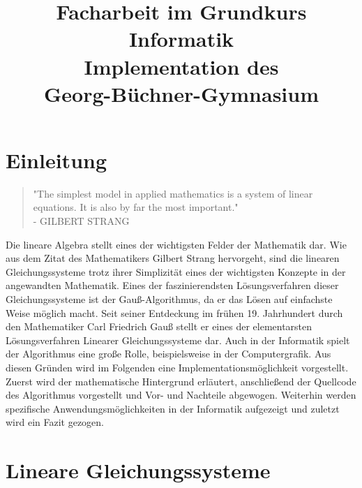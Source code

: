 \documentclass[a4paper, 12pt]{report}
\title{\LARGE Facharbeit im Grundkurs Informatik  \vspace*{0.5cm} \\
  \Huge Implementation des \GA \vspace*{0.5cm} \\
  \LARGE Georg-Büchner-Gymnasium}
\begin{document}
\maketitle
\tableofcontents

{\let\clearpage\relax \chapter{Einleitung}}
\begin{quote}
    "The simplest model in applied mathematics is a system of linear equations.
    It is also by far the most important." \\ - GILBERT STRANG
\end{quote}

Die lineare Algebra stellt eines der wichtigsten Felder der Mathematik dar. Wie aus dem Zitat des Mathematikers Gilbert Strang hervorgeht,
sind die linearen Gleichungssysteme trotz ihrer Simplizität eines der wichtigsten Konzepte in der angewandten Mathematik.
Eines der faszinierendsten Lösungsverfahren dieser Gleichungssysteme ist der Gauß-Algorithmus,
da er das Lösen auf einfachste Weise möglich macht. Seit seiner Entdeckung im frühen 19. Jahrhundert durch den
Mathematiker Carl Friedrich Gauß stellt er eines der elementarsten Lösungsverfahren Linearer Gleichungssysteme dar.
Auch in der Informatik spielt der Algorithmus eine große Rolle, beispielsweise in der Computergrafik. Aus diesen Gründen wird im Folgenden eine Implementationsmöglichkeit
vorgestellt. Zuerst wird der mathematische Hintergrund erläutert, anschließend der Quellcode des Algorithmus vorgestellt und
Vor- und Nachteile abgewogen.
Weiterhin werden spezifische Anwendungsmöglichkeiten in der Informatik aufgezeigt und zuletzt wird ein Fazit gezogen.

\chapter{Lineare Gleichungssysteme}
\end{document}
